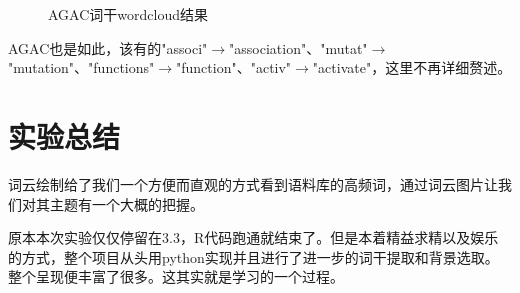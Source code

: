 \documentclass{article}
\begin{document}
\begin{figure}[H]
  \centering
  \caption{AGAC词干wordcloud结果}
  \label{sssdddd}
\end{figure}
AGAC也是如此，该有的"associ"$\rightarrow$"association"、"mutat"$\rightarrow$"mutation"、"functions"$\rightarrow$"function"、"activ"$\rightarrow$"activate"，这里不再详细赘述。
\section{实验总结}
词云绘制给了我们一个方便而直观的方式看到语料库的高频词，通过词云图片让我们对其主题有一个大概的把握。\par
原本本次实验仅仅停留在3.3，R代码跑通就结束了。但是本着精益求精以及娱乐的方式，整个项目从头用python实现并且进行了进一步的词干提取和背景选取。整个呈现便丰富了很多。这其实就是学习的一个过程。\par
\end{document}
